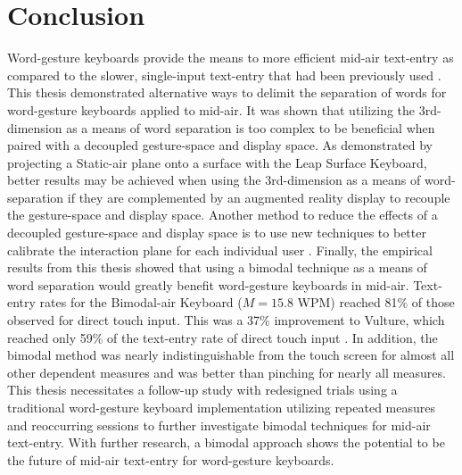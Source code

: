 \section {Conclusion}
Word-gesture keyboards provide the means to more efficient mid-air text-entry as compared to the slower, single-input text-entry that had been previously used \cite{ref_vulture}. This thesis demonstrated alternative ways to delimit the separation of words for word-gesture keyboards applied to mid-air. It was shown that utilizing the 3rd-dimension as a means of word separation is too complex to be beneficial when paired with a decoupled gesture-space and display space. As demonstrated by projecting a Static-air plane onto a surface with the Leap Surface Keyboard, better results may be achieved when using the 3rd-dimension as a means of word-separation if they are complemented by an augmented reality display to recouple the gesture-space and display space. Another method to reduce the effects of a decoupled gesture-space and display space is to use new techniques to better calibrate the interaction plane for each individual user \cite{ref_alvin_thesis,ref_darren_thesis}. Finally, the empirical results from this thesis showed that using a bimodal technique as a means of word separation would greatly benefit word-gesture keyboards in mid-air. Text-entry rates for the Bimodal-air Keyboard ($M = 15.8$ WPM) reached 81\% of those observed for direct touch input. This was a 37\% improvement to Vulture, which reached only 59\% of the text-entry rate of direct touch input \cite{ref_vulture}. In addition, the bimodal method was nearly indistinguishable from the touch screen for almost all other dependent measures and was better than pinching for nearly all measures. This thesis necessitates a follow-up study with redesigned trials using a traditional word-gesture keyboard implementation utilizing repeated measures and reoccurring sessions to further investigate bimodal techniques for mid-air text-entry. With further research, a bimodal approach shows the potential to be the future of mid-air text-entry for word-gesture keyboards.